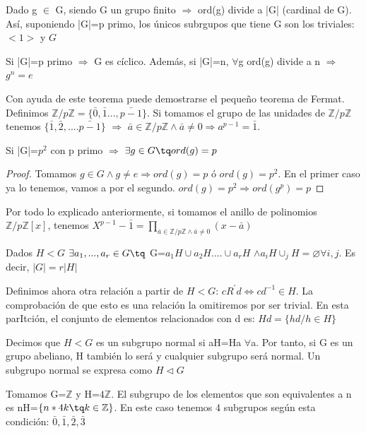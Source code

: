 \documentclass[a4paper,10pt]{apuntes}
\begin{document}
  \begin{corol}
   Dado g $\in$ G, siendo G un grupo finito $\Rightarrow$  ord(g) divide a |G| (cardinal de G). Así, suponiendo |G|=p primo,
   los únicos subrgupos que tiene G son los triviales: $<1>$ y  $G$
  \end{corol}
  \begin{theorem}
   Si |G|=p primo $\Rightarrow$  G es cíclico. Además, si |G|=n, $\forall$g ord(g) divide a n $\Rightarrow$  $g^{n}=e$
  \end{theorem}
  \begin{example}
   Con ayuda de este teorema puede demostrarse el pequeño teorema de Fermat. 
   Definimos $\mathbb{Z}/p\mathbb{Z}=\{\bar{0},\bar{1}...,\bar{p-1}\}$.
   Si tomamos el grupo de las unidades de $\mathbb{Z}/p\mathbb{Z}$ tenemos $\{\bar{1}, \bar{2},....\bar{p-1}\}$ $\Rightarrow$
   $\bar{a}\in\mathbb{Z}/p\mathbb{Z} \wedge \bar{a}\neq 0 \Rightarrow a^{p-1}=\bar{1}$.
  \end{example}
  \begin{theorem}
   Si |G|=$p^{2}$  con p primo $\Rightarrow$  $\exists g \in G \tq ord(g)=p$
  \end{theorem}
  \begin{proof}
   Tomamos $g \in G \wedge g\neq e \Rightarrow ord(g)=p$  ó $ord(g)=p^{2}$. En el primer caso ya lo tenemos, vamos a por el segundo.
   $ord(g)=p^{2}\Rightarrow ord(g^{p})=p$
  \end{proof}
  \begin{example}
   Por todo lo explicado anteriormente, si tomamos el anillo de polinomios $\mathds{Z}/p\mathds{Z}[x]$, tenemos $X^{p-1}-\bar{1}=
   \prod_{\bar{a}\in\mathds{Z}/p\mathds{Z} \wedge \bar{a}\neq 0}(x-\bar{a})$
  \end{example}
  
  \begin{theorem}
   Dados $H<G$  $\exists a_{1},...,a_{r}\in G\tq$  G=$a_{1}H \cup a_{2}H.... \cup a_{r}H$  $\wedge a_{i}H\cup_{j}H=\varnothing \forall i,j$.
   Es decir, $|G|=r|H|$
  \end{theorem}

  Definimos ahora otra relación a partir de $H<G$: $cR^{'}d \Leftrightarrow cd^{-1}\in H$. La comprobación de que esto es una relación
  la omitiremos por ser trivial. En esta parItción, el conjunto de elementos relacionados con d es: $Hd=\{hd/h\in H\}$
  \begin{defn}
   Decimos que $H<G$  es un subgrupo normal si aH=Ha $\forall$a. Por tanto, si G es un grupo abeliano, H también lo será y cualquier
   subgrupo será normal. Un subgrupo normal se expresa como $H\lhd G$
  \end{defn}
  \begin{example}
   Tomamos G=$\mathbb{Z}$  y H=$4\mathbb{Z}$. 
   El subgrupo de los elementos que son equivalentes a n es nH=$\{n*4k\tq k \in \mathbb{Z}\}$.
   En este caso tenemos 4 subgrupos según esta condición: $\bar{0},\bar{1},\bar{2},\bar{3}$
  \end{example}
  
\end{document}
